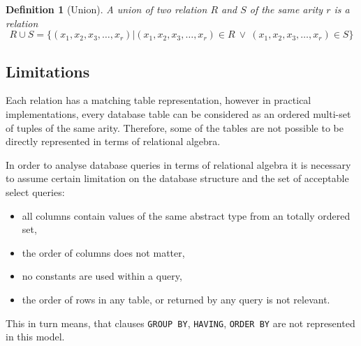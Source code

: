 \documentclass[magisterska,en]{pracamgr}
\newtheorem{defi}{Definition}[section]
\newcommand{\code}[1]{\texttt{#1}}
\begin{document}
\begin{defi}[Union]
A \emph{union} of two relation $R$ and $S$ of the same arity $r$ is a relation
$$
    R\cup S = \{ (x_1, x_2, x_3, \dots, x_r) | (x_1, x_2, x_3, \dots, x_r) \in R\ \lor\ (x_1, x_2, x_3, \dots, x_r)\in S \}
$$
\end{defi}

\subsection{Limitations}

Each relation has a matching table representation, however in practical implementations, every database table can be considered as an ordered multi-set of tuples of the same arity. Therefore, some of the tables are not possible to be directly represented in terms of relational algebra.

In order to analyse database queries in terms of relational algebra it is necessary to assume certain limitation on the database structure and the set of acceptable select queries:
\begin{itemize}
    \item all columns contain values of the same abstract type from an totally ordered set,
    \item the order of columns does not matter,
    \item no constants are used within a query,
    \item the order of rows in any table, or returned by any query is not relevant.
\end{itemize}
This in turn means, that clauses \code{GROUP BY}, \code{HAVING}, \code{ORDER BY} are not represented in this model.

\begin{comment}
\subsection{Queries without sub-queries}
Consider queries without nesting. Such queries can be translated directly by defining a new relation $R \subset domain(R_1) \times domain(R_2)\times \dots \times domain(R_N)$, where $R_1, R_2, \dots, R_N$ are relations representing the tables in the \code{FROM} clause of the original query. The final relation $S \subset R$ can be obtained by removing all elements of $R$ that do not satisfy the \code{WHERE} condition.


\end{comment}
\end{document}
